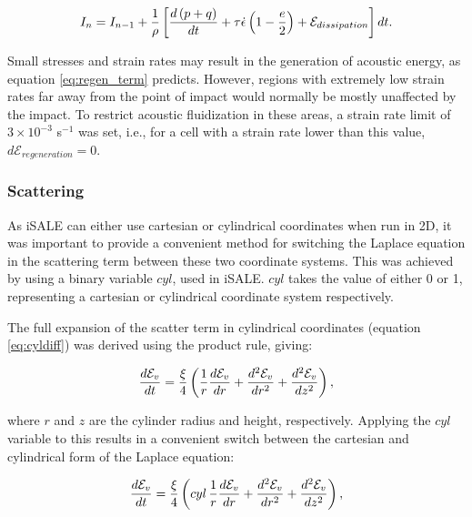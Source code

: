 \begin{equation}\label{eq:internalEnergydt}
I_{n} = I_{n-1} + \frac{1}{\rho}\left[\frac{d \left(p + q\right)}{d t} + \tau \dot{\epsilon}\left(1-\frac{e}{2}\right)+\mathcal{E}_{dissipation}\right] dt.\vspace{0.2cm}
\end{equation}
 
Small stresses and strain rates may result in the generation of acoustic energy, as equation \ref{eq:regen_term} predicts. However, regions with extremely low strain rates far away from the point of impact would normally be mostly unaffected by the impact. To restrict acoustic fluidization in these areas, a strain rate limit of $3\times10^{-3}$ s$^{-1}$ was set, i.e., for a cell with a strain rate lower than this value, $d\mathcal{E}_{regeneration}=0$.

\subsubsection{Scattering \label{sec:scatter}}

As iSALE can either use cartesian or cylindrical coordinates when run in 2D, it was important to provide a convenient method for switching the Laplace equation in the scattering term between these two coordinate systems. This was achieved by using a binary variable $cyl$, used in iSALE. $cyl$ takes the value of either 0 or 1, representing a cartesian or cylindrical coordinate system respectively.

The full expansion of the scatter term in cylindrical coordinates (equation \ref{eq:cyldiff}) was derived using the product rule, giving:

\begin{equation}\label{eq:scatter_expand}
\frac{d \mathcal{E}_{v} }{d t} = \frac{\xi}{4} \left(\frac{1}{r} \frac{d \mathcal{E}_{v}}{dr} + \frac{d^{2} \mathcal{E}_{v}}{dr^{2}} + \frac{d^{2} \mathcal{E}_{v}}{dz^{2}} \right),\vspace{0.2cm}
\end{equation}

where $r$ and $z$ are the cylinder radius and height, respectively. Applying the $cyl$ variable to this results in a convenient switch between the cartesian and cylindrical form of the Laplace equation:

\begin{equation}
\frac{d \mathcal{E}_{v} }{d t} = \frac{\xi}{4} \left(cyl\,\frac{1}{r} \frac{d \mathcal{E}_{v}}{dr} + \frac{d^{2} \mathcal{E}_{v}}{dr^{2}} + \frac{d^{2} \mathcal{E}_{v}}{dz^{2}} \right),\vspace{0.2cm}
\end{equation}

